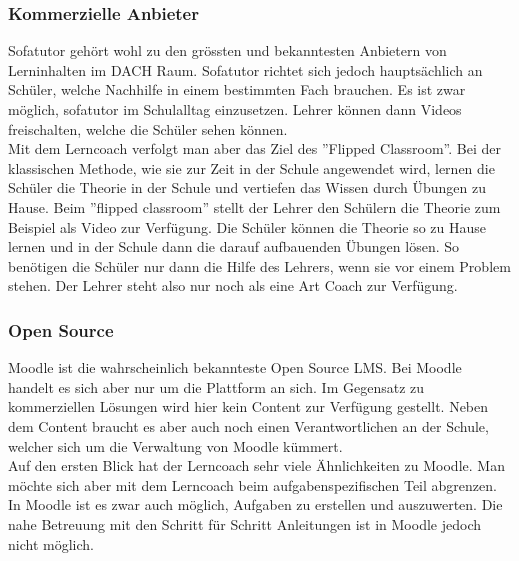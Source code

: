 \subsubsection{Kommerzielle Anbieter}
Sofatutor gehört wohl zu den grössten und bekanntesten Anbietern von Lerninhalten im DACH Raum. Sofatutor richtet sich jedoch hauptsächlich an Schüler, welche Nachhilfe in einem bestimmten Fach brauchen. Es ist zwar möglich, sofatutor im Schulalltag einzusetzen. Lehrer können dann Videos freischalten, welche die Schüler sehen können. \\

\noindent Mit dem Lerncoach verfolgt man aber das Ziel des ''Flipped Classroom''. Bei der klassischen Methode, wie sie zur Zeit in der Schule angewendet wird, lernen die Schüler die Theorie in der Schule und vertiefen das Wissen durch Übungen zu Hause. Beim ''flipped classroom'' stellt der Lehrer den Schülern die Theorie zum Beispiel als Video zur Verfügung. Die Schüler können die Theorie so zu Hause lernen und in der Schule dann die darauf aufbauenden Übungen lösen. So benötigen die Schüler nur dann die Hilfe des Lehrers, wenn sie vor einem Problem stehen. Der Lehrer steht also nur noch als eine Art Coach zur Verfügung. 

\subsubsection{Open Source}
Moodle ist die wahrscheinlich bekannteste Open Source LMS. Bei Moodle handelt es sich aber nur um die Plattform an sich. Im Gegensatz zu kommerziellen Lösungen wird hier kein Content zur Verfügung gestellt. Neben dem Content braucht es aber auch noch einen Verantwortlichen an der Schule, welcher sich um die Verwaltung von Moodle kümmert. \\

\noindent Auf den ersten Blick hat der Lerncoach sehr viele Ähnlichkeiten zu Moodle. Man möchte sich aber mit dem Lerncoach beim aufgabenspezifischen Teil abgrenzen. In Moodle ist es zwar auch möglich, Aufgaben zu erstellen und auszuwerten. Die nahe Betreuung mit den Schritt für Schritt Anleitungen ist in Moodle jedoch nicht möglich.













\newpage